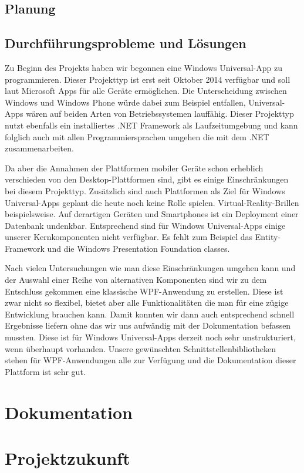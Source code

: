 \documentclass[12pt]{article}
\begin{document}
\subsection{Planung}
\subsection{Durchführungsprobleme und Lösungen}

Zu Beginn des Projekts haben wir begonnen eine Windows Universal-App zu programmieren. Dieser Projekttyp ist erst seit Oktober 2014 verfügbar und soll laut Microsoft Apps für alle Geräte ermöglichen. Die Unterscheidung zwischen Windows und Windows Phone würde dabei zum Beispiel entfallen, Universal-Apps wären auf beiden Arten von Betriebssystemen lauffähig. Dieser Projekttyp nutzt ebenfalls ein installiertes .NET Framework als Laufzeitumgebung und kann folglich auch mit allen Programmiersprachen umgehen die mit dem .NET zusammenarbeiten.
\newline

Da aber die Annahmen der Plattformen mobiler Geräte schon erheblich verschieden von den Desktop-Plattformen sind, gibt es einige Einschränkungen bei diesem Projekttyp. Zusätzlich sind auch Plattformen als Ziel für Windows Universal-Apps geplant die heute noch keine Rolle spielen. Virtual-Reality-Brillen beispielsweise. Auf derartigen Geräten und Smartphones ist ein Deployment einer Datenbank undenkbar. Entsprechend sind für Windows Universal-Apps einige unserer Kernkomponenten nicht verfügbar. Es fehlt zum Beispiel das Entity-Framework und die Windows Presentation Foundation classes.
\newline

Nach vielen Untersuchungen wie man diese Einschränkungen umgehen kann und der Auswahl einer Reihe von alternativen Komponenten sind wir zu dem Entschluss gekommen eine klassische WPF-Anwendung zu erstellen. Diese ist zwar nicht so flexibel, bietet aber alle Funktionalitäten die man für eine zügige Entwicklung brauchen kann. Damit konnten wir dann auch entsprechend schnell Ergebnisse liefern ohne das wir uns aufwändig mit der Dokumentation befassen mussten. Diese ist für Windows Universal-Apps derzeit noch sehr unstrukturiert, wenn überhaupt vorhanden. Unsere gewünschten Schnittstellenbibliotheken stehen für WPF-Anwendungen alle zur Verfügung und die Dokumentation dieser Plattform ist sehr gut.

\newpage
\section{Dokumentation}

\newpage
\section{Projektzukunft}
\end{document}
